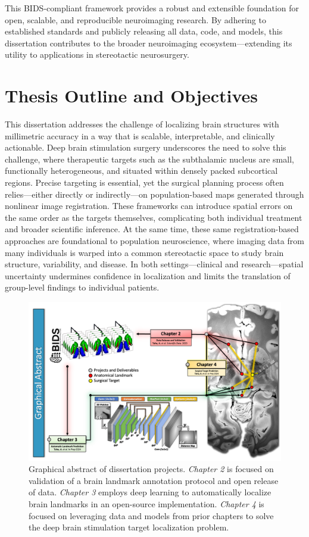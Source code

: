 This BIDS-compliant framework provides a robust and extensible foundation for open, scalable, and reproducible neuroimaging research. By adhering to established standards and publicly releasing all data, code, and models, this dissertation contributes to the broader neuroimaging ecosystem—extending its utility to applications in stereotactic neurosurgery.

\section{Thesis Outline and Objectives}

This dissertation addresses the challenge of localizing brain structures with millimetric accuracy in a way that is scalable, interpretable, and clinically actionable. Deep brain stimulation surgery underscores the need to solve this challenge, where therapeutic targets such as the subthalamic nucleus are small, functionally heterogeneous, and situated within densely packed subcortical regions. Precise targeting is essential, yet the surgical planning process often relies—either directly or indirectly—on population-based maps generated through nonlinear image registration. These frameworks can introduce spatial errors on the same order as the targets themselves, complicating both individual treatment and broader scientific inference. At the same time, these same registration-based approaches are foundational to population neuroscience, where imaging data from many individuals is warped into a common stereotactic space to study brain structure, variability, and disease. In both settings—clinical and research—spatial uncertainty undermines confidence in localization and limits the translation of group-level findings to individual patients.

\begin{figure}[hbt!]
    \centering
    \includegraphics[width=1\linewidth]{figs/ch1_Figure_Abstract.png}
    \caption{Graphical abstract of dissertation projects. \textit{Chapter 2} is focused on validation of a brain landmark annotation protocol and open release of data. \textit{Chapter 3} employs deep learning to automatically localize brain landmarks in an open-source implementation. \textit{Chapter 4} is focused on leveraging data and models from prior chapters to solve the deep brain stimulation target localization problem.}
    \label{fig:Abstract}
\end{figure}


